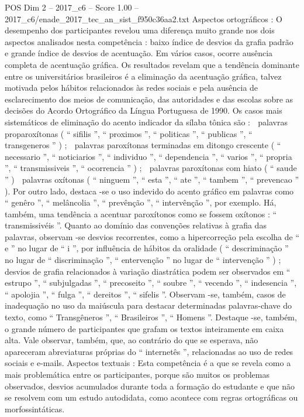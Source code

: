 \begin{textsample}{POS Dim 2 – 2017\_c6 – Score 1.00 – 2017\_c6/enade\_2017\_tec\_an\_sist\_f950c36aa2.txt}
Aspectos ortográficos : O desempenho dos participantes revelou uma diferença muito grande nos dois aspectos analisados nesta competência : baixo índice de desvios da grafia padrão e grande índice de desvios de acentuação.
Em vários casos, ocorre ausência completa de acentuação gráfica.
Os resultados revelam que a tendência dominante entre os universitários brasileiros é a eliminação da acentuação gráfica, talvez motivada pelos hábitos relacionados às redes sociais e pela ausência de esclarecimento dos meios de comunicação, das autoridades e das escolas sobre as decisões do Acordo Ortográfico da Língua Portuguesa de 1990.
Os casos mais sistemáticos de eliminação do acento indicador da sílaba tônica são :  palavras proparoxítonas ( “ sifilis ”, “ proximos ”, “ politicas ”, “ publicas ”, “ transgeneros ” ) ;  palavras paroxítonas terminadas em ditongo crescente ( “ necessario ”, “ noticiarios ”, “ individuo ”, “ dependencia ”, “ varios ”, “ propria ”, “ transmissiveis ”, “ ocorrencia ” ) ;  palavras paroxítonas com hiato ( “ saude ” )  palavras oxítonas ( “ ninguem ”, “ esta ”, “ ate ”, “ tambem ”, “ prevencao ” ).
Por outro lado, destaca -se o uso indevido do acento gráfico em palavras como “ genêro ”, “ melâncolia ”, “ prevênção ”, “ intervênção ”, por exemplo.
Há, também, uma tendência a acentuar paroxítonos como se fossem oxítonos : “ transmissivéis ”.
Quanto ao domínio das convenções relativas à grafia das palavras, observam -se desvios recorrentes, como a hipercorreção pela escolha de “ e ” no lugar de “ i ”, por influência de hábitos da oralidade ( “ descriminação ” no lugar de “ discriminação ”, “ entervenção ” no lugar de “ intervenção ” ) ; desvios de grafia relacionados à variação diastrática podem ser observados em “ estrupo ”, “ subjulgadas ”, “ precoseito ”, “ soubre ”, “ vecendo ”, “ indesencia ”, “ apolojia ”, “ fulga ”, “ dereitos ”, “ sifelis ”.
Observam -se, também, casos de inadequação no uso da maiúscula para destacar determinadas palavras-chave do texto, como “ Transgêneros ”, “ Brasileiros ”, “ Homens ”.
Destaque -se, também, o grande número de participantes que grafam os textos inteiramente em caixa alta.
Vale observar, também, que, ao contrário do que se esperava, não apareceram abreviaturas próprias do “ internetês ”, relacionadas ao uso de redes sociais e e-mails.
Aspectos textuais : Esta competência é a que se revela como a mais problemática entre os participantes, porque são muitos os problemas observados, desvios acumulados durante toda a formação do estudante e que não se resolvem com um estudo autodidata, como acontece com regras ortográficas ou morfossintáticas.

\end{textsample}
